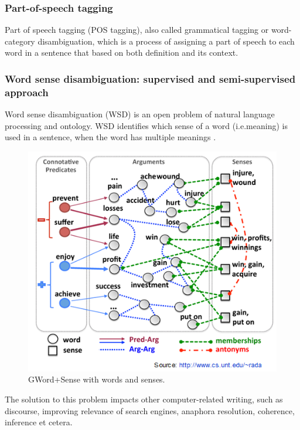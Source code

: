 \subsubsection*{Part-of-speech tagging}

Part of speech tagging (POS tagging), also called grammatical tagging or word-category disambiguation, which is a process 
of assigning a part of speech to each word in a sentence that based on both definition and its context.\\

\subsubsection*{Word sense disambiguation: supervised and semi-supervised approach}

Word sense disambiguation (WSD) is an open problem of natural language processing and ontology. 
WSD identifies which sense of a word (i.e.meaning) is used in a sentence,
when the word has multiple meanings \cite{Du2013}. 

\begin{figure}[tbh]
	\begin{center}
		\includegraphics[width=\columnwidth]{Union_Background_Chart_WSD}
	\end{center}
	\caption{GWord+Sense with words and senses. \label{fig1}}
\end{figure}

The solution to this problem impacts other computer-related writing, such as discourse, 
improving relevance of search engines, anaphora resolution, coherence, inference et cetera.

